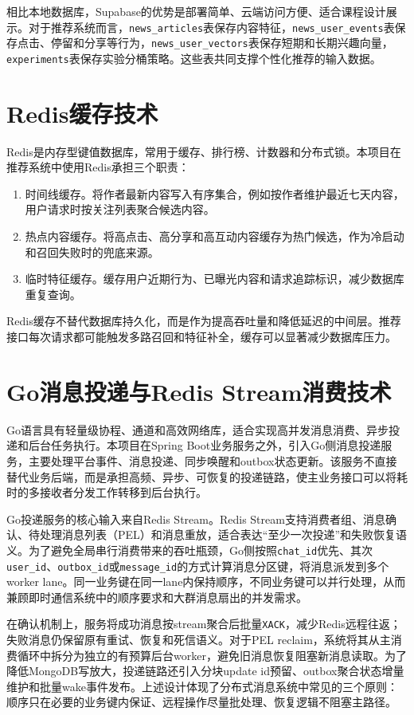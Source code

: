 相比本地数据库，Supabase的优势是部署简单、云端访问方便、适合课程设计展示。对于推荐系统而言，\texttt{news\_articles}表保存内容特征，\texttt{news\_user\_events}表保存点击、停留和分享等行为，\texttt{news\_user\_vectors}表保存短期和长期兴趣向量，\texttt{experiments}表保存实验分桶策略。这些表共同支撑个性化推荐的输入数据。

\section{Redis缓存技术}

Redis是内存型键值数据库，常用于缓存、排行榜、计数器和分布式锁。本项目在推荐系统中使用Redis承担三个职责：

\begin{enumerate}
  \item 时间线缓存。将作者最新内容写入有序集合，例如按作者维护最近七天内容，用户请求时按关注列表聚合候选内容。
  \item 热点内容缓存。将高点击、高分享和高互动内容缓存为热门候选，作为冷启动和召回失败时的兜底来源。
  \item 临时特征缓存。缓存用户近期行为、已曝光内容和请求追踪标识，减少数据库重复查询。
\end{enumerate}

Redis缓存不替代数据库持久化，而是作为提高吞吐量和降低延迟的中间层。推荐接口每次请求都可能触发多路召回和特征补全，缓存可以显著减少数据库压力。

\section{Go消息投递与Redis Stream消费技术}

Go语言具有轻量级协程、通道和高效网络库，适合实现高并发消息消费、异步投递和后台任务执行。本项目在Spring Boot业务服务之外，引入Go侧消息投递服务，主要处理平台事件、消息投递、同步唤醒和outbox状态更新。该服务不直接替代业务后端，而是承担高频、异步、可恢复的投递链路，使主业务接口可以将耗时的多接收者分发工作转移到后台执行。

Go投递服务的核心输入来自Redis Stream。Redis Stream支持消费者组、消息确认、待处理消息列表（PEL）和消息重放，适合表达“至少一次投递”和失败恢复语义。为了避免全局串行消费带来的吞吐瓶颈，Go侧按照\texttt{chat\_id}优先、其次\texttt{user\_id}、\texttt{outbox\_id}或\texttt{message\_id}的方式计算消息分区键，将消息派发到多个worker lane。同一业务键在同一lane内保持顺序，不同业务键可以并行处理，从而兼顾即时通信系统中的顺序要求和大群消息扇出的并发需求。

在确认机制上，服务将成功消息按stream聚合后批量\texttt{XACK}，减少Redis远程往返；失败消息仍保留原有重试、恢复和死信语义。对于PEL reclaim，系统将其从主消费循环中拆分为独立的有预算后台worker，避免旧消息恢复阻塞新消息读取。为了降低MongoDB写放大，投递链路还引入分块update id预留、outbox聚合状态增量维护和批量wake事件发布。上述设计体现了分布式消息系统中常见的三个原则：顺序只在必要的业务键内保证、远程操作尽量批处理、恢复逻辑不阻塞主路径。

